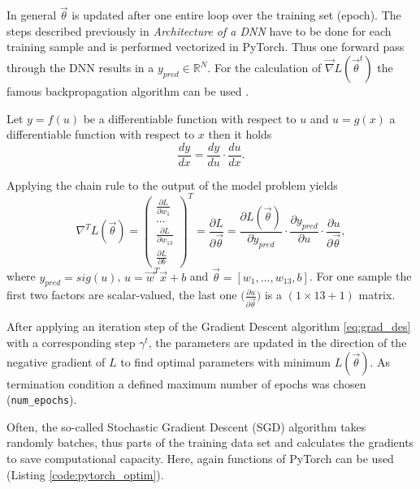 In general $\vec{\theta}$ is updated after one entire loop over the training set (epoch). The steps described previously in \textit{Architecture of a DNN} have to be done for each training sample and is performed vectorized in PyTorch. Thus one forward pass through the DNN results in a $y_{pred} \in \mathbb{R}^N$. For the calculation of $\vec{\nabla}L(\vec{\theta}^t)$ the famous backpropagation algorithm can be used \cite{Rumelhart1986Oct}.

\begin{definition}
Let $y=f(u)$ be a differentiable function with respect to $u$ and $u=g(x)$ a differentiable function with respect to $x$ then it holds
\begin{equation}
    \frac{dy}{dx} = \frac{dy}{du}\cdot\frac{du}{dx}.
    \label{eq:chain_rule}
\end{equation}
\end{definition}

Applying the chain rule to the output of the model problem yields
\begin{equation}
    \nabla^TL(\vec{\theta}) = \left(\begin{array}{c} \frac{\partial L}{\partial w_1} \\ ... \\ \frac{\partial L}{\partial w_{13}} \\ \frac{\partial L}{\partial b} \end{array}\right)^T =\frac{\partial L}{\partial \vec{\theta}} = \frac{\partial L(\vec{\theta})}{\partial y_{pred}}\cdot\frac{\partial y_{pred}}{\partial u}\cdot\frac{\partial u}{\partial \vec{\theta}},
\end{equation}
where $y_{pred} = sig(u)$, $u = \vec{w}^T\vec{x}+b$ and $\vec{\theta} = [w_1, ..., w_{13}, b]$. For one sample the first two factors are scalar-valued, the last one $\bigl(\frac{\partial u}{\partial \vec{\theta}}\bigr)$ is a $(1 \times 13 + 1)$ matrix.

After applying an iteration step of the Gradient Descent algorithm \ref{eq:grad_des} with a corresponding step $\gamma^t$, the parameters are updated in the direction of the negative gradient of $L$ to find optimal parameters with minimum $L(\vec{\theta})$. As termination condition a defined maximum number of epochs was chosen (\texttt{num\_epochs}).

Often, the so-called Stochastic Gradient Descent (SGD) algorithm takes randomly batches, thus parts of the training data set and calculates the gradients to save computational capacity. Here, again functions of PyTorch can be used (Listing \ref{code:pytorch_optim}).

